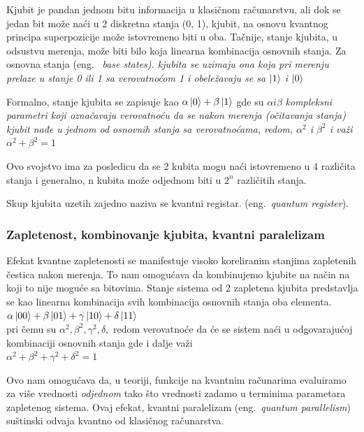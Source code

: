 \documentclass[a4paper]{article}
\begin{document}
{Kjubit je pandan jednom bitu informacija u klasičnom računarstvu, ali dok se jedan bit može naći u 2 diskretna stanja (0, 1),
kjubit, na osnovu kvantnog principa superpozicije može istovremeno biti u oba.
Tačnije, stanje kjubita, u odsustvu merenja, može biti bilo koja linearna kombinacija osnovnih stanja.
Za osnovna stanja (eng. ~\em base states). kjubita se uzimaju ona koja pri merenju prelaze u stanje 0 ili 1 sa verovatnoćom 1 i obeležavaju se sa $\ket{1}$ i $\ket{0}$

Formalno, stanje kjubita se zapisuje kao $\alpha \ket{0} + \beta \ket{1}$ gde su $\alpha i \beta$ \em{kompleksni} parametri koji označavaju verovatnoću da se nakon merenja (očitavanja stanja) kjubit nađe u jednom od osnovnih stanja sa verovatnoćama, redom, $\alpha^2$ i $\beta^2$ i važi $\alpha^2+\beta^2=1$

Ovo svojstvo ima za posledicu da se 2 kubita mogu naći istovremeno u 4 različita stanja i generalno, n kubita može odjednom biti u $2^n$ različitih stanja.

Skup kjubita uzetih zajedno naziva se kvantni registar. (eng.~\emph{quantum register}).

\subsubsection{Zapletenost, kombinovanje kjubita, kvantni paralelizam}
\label{entanglement}

Efekat kvantne zapletenosti se manifestuje visoko koreliranim stanjima zapletenih čestica nakon merenja.
To nam omogućava da kombinujemo kjubite na način na koji to nije moguće sa bitovima. Stanje sistema od 2 zapletena kjubita predstavlja se kao linearna kombinacija svih kombinacija osnovnih stanja oba elementa.\\

$\alpha\ket{00} + \beta\ket{01} + \gamma\ket{10} + \delta\ket{11}$\\

pri čemu su $\alpha^2, \beta^2, \gamma^2, \delta,$ redom verovatnoće da će se sistem naći u odgovarajućoj kombinaciji osnovnih stanja gde i dalje važi\\

$\alpha^2+\beta^2+\gamma^2+\delta^2=1$

Ovo nam omogućava da, u teoriji, funkcije na kvantnim računarima evaluiramo za više vrednosti \emph{odjednom} tako što vrednosti zadamo u terminima parametara zapletenog sistema. Ovaj efekat, kvantni paralelizam (eng.~\emph{quantum parallelism}) suštinski odvaja kvantno od klasičnog računarstva.

}
\end{document}
